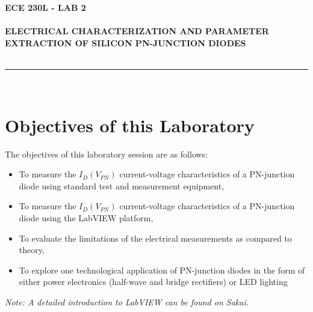 \documentclass[12pt]{../manual}
\begin{document}
\begin{center}
\textbf{\huge ECE 230L - LAB 2}\\~\\
\textbf{\large ELECTRICAL CHARACTERIZATION AND PARAMETER EXTRACTION OF SILICON PN-JUNCTION DIODES}\\~\\
\rule{6.5in}{0.5mm}\\
\end{center}

\tableofcontents

\listoffigures

\newpage
%
\section{Objectives of this Laboratory}
The objectives of this laboratory session are as follows:
\begin{itemize}
\item To measure the $I_D(V_{PN})$ current-voltage characteristics of a PN-junction diode using standard test and measurement equipment,
\item To measure the $I_D(V_{PN})$ current-voltage characteristics of a PN-junction diode using the LabVIEW platform,
\item To evaluate the limitations of the electrical measurements as compared to theory,
\item To explore one technological application of PN-junction diodes in the form of either power electronics (half-wave and bridge rectifiers) or LED lighting
\end{itemize}
\textit{Note: A detailed introduction to LabVIEW can be found on Sakai.}
\end{document}
